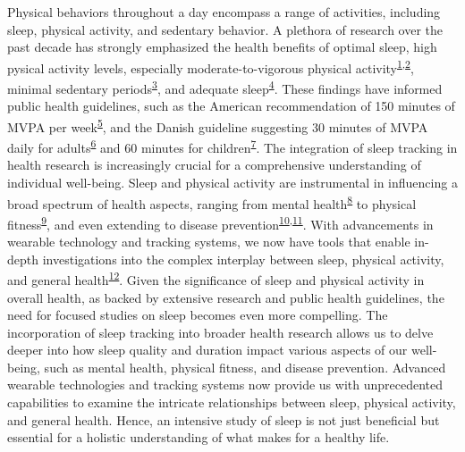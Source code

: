 \documentclass[
  9pt,
]{scrbook}
\begin{document}
Physical behaviors throughout a day encompass a range of activities,
including sleep, physical activity, and sedentary behavior. A plethora
of research over the past decade has strongly emphasized the health
benefits of optimal sleep, high pysical activity levels, especially
moderate-to-vigorous physical
activity\textsuperscript{\protect\hyperlink{ref-kraus_physical_2019}{1},\protect\hyperlink{ref-lee_effect_2012}{2}},
minimal sedentary
periods\textsuperscript{\protect\hyperlink{ref-wilmot_sedentary_2012}{3}},
and adequate
sleep\textsuperscript{\protect\hyperlink{ref-cappuccio_sleep_2010}{4}}.
These findings have informed public health guidelines, such as the
American recommendation of 150 minutes of MVPA per
week\textsuperscript{\protect\hyperlink{ref-kl_physical_2018}{5}}, and
the Danish guideline suggesting 30 minutes of MVPA daily for
adults\textsuperscript{\protect\hyperlink{ref-el-zine_fysisk_nodate-1}{6}}
and 60 minutes for
children\textsuperscript{\protect\hyperlink{ref-el-zine_fysisk_nodate}{7}}.
The integration of sleep tracking in health research is increasingly
crucial for a comprehensive understanding of individual well-being.
Sleep and physical activity are instrumental in influencing a broad
spectrum of health aspects, ranging from mental
health\textsuperscript{\protect\hyperlink{ref-biddle_physical_2011}{8}}
to physical
fitness\textsuperscript{\protect\hyperlink{ref-warburton_health_2017}{9}},
and even extending to disease
prevention\textsuperscript{\protect\hyperlink{ref-strath_guide_2013}{10},\protect\hyperlink{ref-arem_leisure_2015}{11}}.
With advancements in wearable technology and tracking systems, we now
have tools that enable in-depth investigations into the complex
interplay between sleep, physical activity, and general
health\textsuperscript{\protect\hyperlink{ref-rollo_whole_2020}{12}}.
Given the significance of sleep and physical activity in overall health,
as backed by extensive research and public health guidelines, the need
for focused studies on sleep becomes even more compelling. The
incorporation of sleep tracking into broader health research allows us
to delve deeper into how sleep quality and duration impact various
aspects of our well-being, such as mental health, physical fitness, and
disease prevention. Advanced wearable technologies and tracking systems
now provide us with unprecedented capabilities to examine the intricate
relationships between sleep, physical activity, and general health.
Hence, an intensive study of sleep is not just beneficial but essential
for a holistic understanding of what makes for a healthy life.
\end{document}
